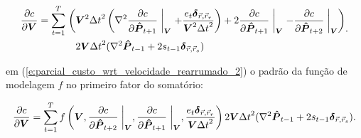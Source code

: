   \begin{equation} \label{e:parcial_custo_wrt_velocidade_rearrumado_2}
    \DIFdelbegin %
\DIFdelend \DIFaddbegin \begin{split}
      \frac{\partial c}{\partial \boldsymbol{V}} =
      \sum \limits_{t=1}^T \biggm(
        & \boldsymbol{V}^2 {\Delta t}^2 \left(
          \nabla^2 \frac{\partial c}{\partial \boldsymbol{\hat{P}}_{t+1}} \biggm\lvert_{\boldsymbol{V}} + \frac{e_t \boldsymbol{\delta}_{\vec{r}, \vec{r}_r}}{\boldsymbol{V}^2 {\Delta t}^2}
        \right) + 2 \frac{\partial c}{\partial \boldsymbol{\hat{P}}_{t+1}} \biggm\lvert_{\boldsymbol{V}} -
        \frac{\partial c}{\partial \boldsymbol{\hat{P}}_{t+2}} \biggm\lvert_{\boldsymbol{V}}
      \biggm) \\
      & 2 \boldsymbol{V} {\Delta t}^2 (\nabla^2 \boldsymbol{\hat{P}}_{t-1} + 2 s_{t-1} \boldsymbol{\delta}_{\vec{r}, \vec{r}_s})
    \end{split}\DIFaddend 
    .
  \end{equation}

  \noindent \DIFdelbegin {}\DIFdelend \DIFaddbegin {}\DIFaddend em (\ref{e:parcial_custo_wrt_velocidade_rearrumado_2}) o padrão da função de modelagem $f$ no primeiro fator do somatório:

  \begin{equation} \label{e:parcial_custo_wrt_velocidade_propagacao_reversa}
    \frac{\partial c}{\partial \boldsymbol{V}} =
    \sum \limits_{t=1}^T
    f\left(\boldsymbol{V},
      \frac{\partial c}{\partial \boldsymbol{\hat{P}}_{t+2}} \biggm\lvert_{\boldsymbol{V}}, \frac{\partial c}{\partial \boldsymbol{\hat{P}}_{t+1}} \biggm\lvert_{\boldsymbol{V}}, \frac{e_t \boldsymbol{\delta}_{\vec{r}, \vec{r}_r}}{\boldsymbol{V} {\Delta t}^2}
    \right)
    2 \boldsymbol{V} {\Delta t}^2 (\nabla^2 \boldsymbol{\hat{P}}_{t-1} + 2 s_{t-1} \boldsymbol{\delta}_{\vec{r}, \vec{r}_s})
    .
  \end{equation}

